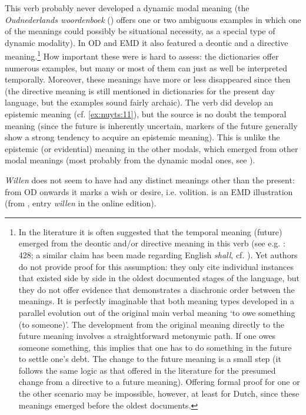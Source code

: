 \documentclass[output=paper]{langsci/langscibook}
\begin{document}
This verb probably never developed a dynamic modal meaning (the \textit{Oudnederlands woordenboek} (\citeyear{Oudnederlandswoordenboek2012}) offers one or two ambiguous examples in which one of the meanings could possibly be situational necessity, as a special type of dynamic modality). In OD and EMD it also featured a deontic and a directive meaning.\footnote{In the literature it is often suggested that the temporal meaning (future) emerged from the deontic and/or directive meaning in this verb (see e.g. \citealt{Duinhoven1997}: 428; a similar claim has been made regarding English \textit{shall}, cf. \citealt{BybeeBybee1987, BybeeBybee1991}). Yet authors do not provide proof for this assumption: they only cite individual instances that existed side by side in the oldest documented stages of the language, but they do not offer evidence that demonstrates a diachronic order between the meanings. It is perfectly imaginable that both meaning types developed in a parallel evolution out of the original main verbal meaning ‘to owe something (to someone)’. The development from the original meaning directly to the future meaning involves a straightforward metonymic path. If one owes someone something, this implies that one has to do something in the future to settle one’s debt. The change to the future meaning is a small step (it follows the same logic as that offered in the literature for the presumed change from a directive to a future meaning). Offering formal proof for one or the other scenario may be impossible, however, at least for Dutch, since these meanings emerged before the oldest documents.}  How important these were is hard to assess: the dictionaries offer numerous examples, but many or most of them can just as well be interpreted temporally. Moreover, these meanings have more or less disappeared since then (the directive meaning is still mentioned in dictionaries for the present day language, but the examples sound fairly archaic). The verb did develop an epistemic meaning (cf. \ref{ex:nuyts:11}), but the source is no doubt the temporal meaning (since the future is inherently uncertain, markers of the future generally show a strong tendency to acquire an epistemic meaning). This is unlike the epistemic (or evidential) meaning in the other modals, which emerged from other modal meanings (most probably from the dynamic modal ones, see \citealt{BylooNuyts2014}).

\textit{Willen} does not seem to have had any distinct meanings other than the present: from OD onwards it marks a wish or desire, i.e. volition.  is an EMD illustration (from \citealt{PijnenburgEtAl2000}, entry \textit{willen} in the online edition).
\end{document}
